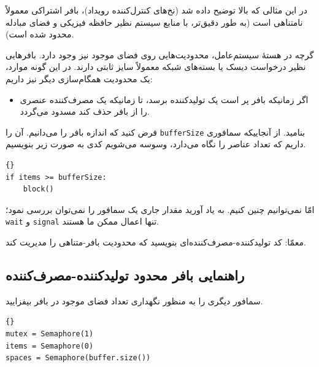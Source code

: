 \documentclass{book}
\newcommand{\clearemptydoublepage}{}%
\begin{document}
    در این مثالی که بالا توضیح داده شد (نخ‌های کنترل‌کننده رویداد)، بافر اشتراکی معمولاً نامتناهی است (به طور دقیق‌تر، 
    با منابع سیستم نظیر حافظه فیزیکی و فضای مبادله محدود شده است).

    گرچه در هستهٔ سیستم‌عامل، محدودیت‌هایی روی فضای موجود نیز وجود دارد. بافرهایی نظیر درخواست دیسک یا بسته‌های شبکه معمولاً سایز ثابتی دارند. 
    در این گونه موارد،‌ یک محدودیت همگام‌سازی دیگر نیز داریم:

\begin{itemize}

\item 
    اگر زمانیکه بافر پر است یک تولیدکننده برسد، تا زمانیکه یک مصرف‌کننده عنصری را از بافر حذف کند مسدود می‌گردد. 

\end{itemize}

    فرض کنید که اندازه بافر را می‌دانیم. آن را {\tt bufferSize} بنامید. از آنجاییکه سمافوری داریم که تعداد عناصر را نگاه می‌دارد،‌ وسوسه می‌شویم 
    کدی به صورت زیر بنویسیم.

\begin{latin}
\begin{lstlisting}[title=\rl{راه‌حل معیوب بافر محدود}]{}
if items >= bufferSize:
    block()
\end{lstlisting}
\end{latin}

    امّا نمی‌توانیم چنین کنیم. به یاد آورید مقدار جاری یک سمافور را نمی‌توان بررسی نمود؛ {\tt wait} و {\tt signal} تنها  اعمال ممکن ما هستند. 
    
    معمّا: کد تولیدکننده-مصرف‌کننده‌ای بنویسید که محدودیت بافر-متناهی را مدیریت کند. 
    

\clearemptydoublepage
\subsection{ راهنمایی بافر محدود تولیدکننده-مصرف‌کننده }

    سمافور دیگری را به منظور نگهداری تعداد فضای موجود در بافر  بیفزایید. 
\begin{latin}
\begin{lstlisting}[title=\rl{مقداردهی اولیهٔ بافر محدود تولیدکننده-مصرف‌کننده}]{}
mutex = Semaphore(1)
items = Semaphore(0)
spaces = Semaphore(buffer.size())
\end{lstlisting}
\end{latin}
\end{document}

